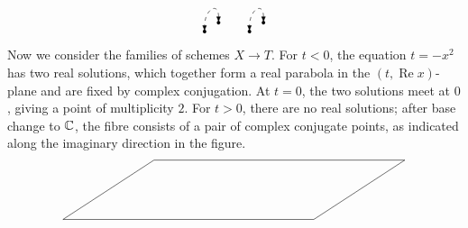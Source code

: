 \begin{example}
\[\begin{tikzpicture}[>=Latex, scale=1]
            \coordinate (C2) at (1.60,-0.17);
            \begin{scope}[shift={(C2)},rotate=\ang]
                \coordinate (C2a) at (0,\A);
                \coordinate (C2b) at (0,-\A);
                \fill (C2a) circle (1.4pt);
                \fill (C2b) circle (1.4pt);
            \end{scope}
            \draw[dashed, <->]
                (C2a)
                .. controls ([yshift=0.60cm]C2a)
                            and ([yshift=0.60cm]C2b) ..
                (C2b);
        
            \coordinate (C3) at (2.85,-0.17);
            \begin{scope}[shift={(C3)},rotate=\ang]
                \coordinate (C3a) at (0,\A);
                \coordinate (C3b) at (0,-\A);
                \fill (C3a) circle (1.4pt);
                \fill (C3b) circle (1.4pt);
            \end{scope}
            \draw[dashed, <->]
                (C3a)
                .. controls ([yshift=0.60cm]C3a)
                            and ([yshift=0.60cm]C3b) ..
                (C3b);
        
        \end{tikzpicture}
    \]
    Now we consider the families of schemes $X \to T$. For $t < 0$, the equation $t = -x^2$ has two real solutions, which together form a real parabola in the $(t,\operatorname{Re}x)$-plane and are fixed by complex conjugation. At $t = 0$, the two solutions meet at $0$, giving a point of multiplicity $2$. For $t > 0$, there are no real solutions; after base change to $\mathbb{C}$, the fibre consists of a pair of complex conjugate points, as indicated along the imaginary direction in the figure.
    \[
        \begin{tikzpicture}[
            >=Latex,
            x={(1cm,0cm)},          %
            y={(0.77cm,0.50cm)},    %
            z={(0cm,1cm)}           %
        ]
        
        
        \coordinate (A) at (-3.5,-1.8,0);
        \coordinate (B) at ( 3.5,-1.8,0);
        \coordinate (C) at ( 3.5, 1.5,0);
        \coordinate (D) at (-3.5, 1.5,0);
        
        \draw (A) -- (B) -- (C) -- (D) -- cycle;
        

\end{tikzpicture}\]
\end{example}

